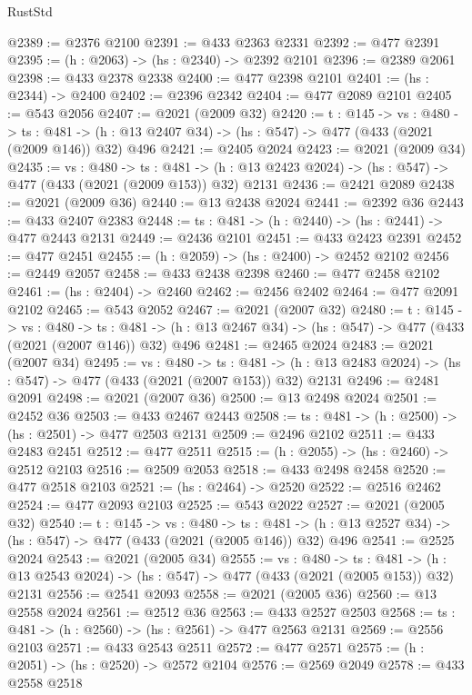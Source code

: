 \begin{lexlean}{RustStd}
\begin{coremodule}
{\begin{coremodule}
{{{{{{{{{{{{{{{{@2389 := @2376 @2100
@2391 := @433 @2363 @2331
@2392 := @477 @2391
@2395 := (h : @2063) -> (hs : @2340) -> @2392 @2101
@2396 := @2389 @2061
@2398 := @433 @2378 @2338
@2400 := @477 @2398 @2101
@2401 := (hs : @2344) -> @2400
@2402 := @2396 @2342
@2404 := @477 @2089 @2101
@2405 := @543 @2056
@2407 := @2021 (@2009 @32)
@2420 := {t : @145} ->
  {vs : @480} ->
  {ts : @481} -> (h : @13 @2407 @34) -> (hs : @547) -> @477 (@433 (@2021 (@2009 @146)) @32) @496
@2421 := @2405 @2024
@2423 := @2021 (@2009 @34)
@2435 := {vs : @480} ->
  {ts : @481} -> (h : @13 @2423 @2024) -> (hs : @547) -> @477 (@433 (@2021 (@2009 @153)) @32) @2131
@2436 := @2421 @2089
@2438 := @2021 (@2009 @36)
@2440 := @13 @2438 @2024
@2441 := @2392 @36
@2443 := @433 @2407 @2383
@2448 := {ts : @481} -> (h : @2440) -> (hs : @2441) -> @477 @2443 @2131
@2449 := @2436 @2101
@2451 := @433 @2423 @2391
@2452 := @477 @2451
@2455 := (h : @2059) -> (hs : @2400) -> @2452 @2102
@2456 := @2449 @2057
@2458 := @433 @2438 @2398
@2460 := @477 @2458 @2102
@2461 := (hs : @2404) -> @2460
@2462 := @2456 @2402
@2464 := @477 @2091 @2102
@2465 := @543 @2052
@2467 := @2021 (@2007 @32)
@2480 := {t : @145} ->
  {vs : @480} ->
  {ts : @481} -> (h : @13 @2467 @34) -> (hs : @547) -> @477 (@433 (@2021 (@2007 @146)) @32) @496
@2481 := @2465 @2024
@2483 := @2021 (@2007 @34)
@2495 := {vs : @480} ->
  {ts : @481} -> (h : @13 @2483 @2024) -> (hs : @547) -> @477 (@433 (@2021 (@2007 @153)) @32) @2131
@2496 := @2481 @2091
@2498 := @2021 (@2007 @36)
@2500 := @13 @2498 @2024
@2501 := @2452 @36
@2503 := @433 @2467 @2443
@2508 := {ts : @481} -> (h : @2500) -> (hs : @2501) -> @477 @2503 @2131
@2509 := @2496 @2102
@2511 := @433 @2483 @2451
@2512 := @477 @2511
@2515 := (h : @2055) -> (hs : @2460) -> @2512 @2103
@2516 := @2509 @2053
@2518 := @433 @2498 @2458
@2520 := @477 @2518 @2103
@2521 := (hs : @2464) -> @2520
@2522 := @2516 @2462
@2524 := @477 @2093 @2103
@2525 := @543 @2022
@2527 := @2021 (@2005 @32)
@2540 := {t : @145} ->
  {vs : @480} ->
  {ts : @481} -> (h : @13 @2527 @34) -> (hs : @547) -> @477 (@433 (@2021 (@2005 @146)) @32) @496
@2541 := @2525 @2024
@2543 := @2021 (@2005 @34)
@2555 := {vs : @480} ->
  {ts : @481} -> (h : @13 @2543 @2024) -> (hs : @547) -> @477 (@433 (@2021 (@2005 @153)) @32) @2131
@2556 := @2541 @2093
@2558 := @2021 (@2005 @36)
@2560 := @13 @2558 @2024
@2561 := @2512 @36
@2563 := @433 @2527 @2503
@2568 := {ts : @481} -> (h : @2560) -> (hs : @2561) -> @477 @2563 @2131
@2569 := @2556 @2103
@2571 := @433 @2543 @2511
@2572 := @477 @2571
@2575 := (h : @2051) -> (hs : @2520) -> @2572 @2104
@2576 := @2569 @2049
@2578 := @433 @2558 @2518
}}}}}}}}}}}}}}}}
\end{coremodule}}
\end{coremodule}
\end{lexlean}

